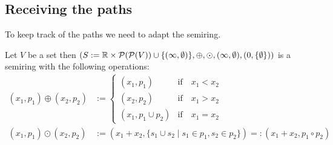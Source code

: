 \subsection{Receiving the paths}
To keep track of the paths we need to adapt the semiring. 
\begin{lemma}
    Let $V$ be a set then $(S := \mathbb{R} \times \mathcal{P}(\mathcal{P}(V)) \cup \{(\infty, \emptyset)\}, \oplus, \odot, (\infty, \emptyset), (0, \{\emptyset\}))$ is a semiring with the following operations:
    \begin{align*}
        (x_1, p_1) \oplus (x_2, p_2) &:= \begin{cases}
            (x_1, p_1) &\textrm{if}\quad x_1 < x_2 \\
            (x_2, p_2) &\textrm{if}\quad x_1 > x_2\\
            (x_1, p_1 \cup p_2) &\textrm{if}\quad x_1 = x_2
        \end{cases}\\
        (x_1, p_1) \odot (x_2, p_2) &:= (x_1 + x_2, \{s_1 \cup s_2 \mid s_1 \in p_1, s_2 \in p_2\}) =: (x_1 + x_2, p_1 \circ p_2)
    \end{align*}
\end{lemma}
